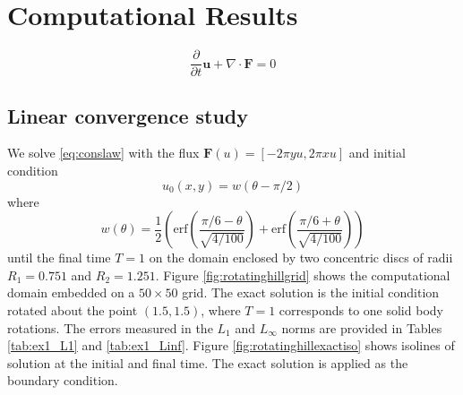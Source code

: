 \section{Computational Results}\label{compResults}
\begin{equation} \label{eq:conslaw}
   \frac{\partial}{\partial t} \mathbf{u} + \nabla \cdot \mathbf{F} = 0
\end{equation}
\subsection{Linear convergence study}
We solve \eqref{eq:conslaw} with the flux $\mathbf{F}(u) = [-2\pi y u, 2\pi x u]$ and initial condition
$$
u_0(x,y) = w(\theta - \pi/2)
$$
where
$$
w(\theta) = \frac{1}{2}\left( \text{erf}\left( \frac{\pi/6 - \theta}{\sqrt{4/100}} \right) + \text{erf}\left( \frac{\pi/6 + \theta}{\sqrt{4/100}} \right)\right)
$$
until the final time $T = 1$ on the domain enclosed by two concentric discs of radii $R_1 = 0.751$ and $R_2 = 1.251$.  Figure \ref{fig:rotatinghillgrid} shows the computational domain embedded on a $50 \times 50$ grid.  The exact solution is the initial condition rotated about the point $(1.5,1.5)$, where $T=1$ corresponds to one solid body rotations.  The errors measured in the $L_1$ and $L_\infty$ norms are provided in Tables \ref{tab:ex1_L1} and \ref{tab:ex1_Linf}.
Figure
\ref{fig:rotatinghillexactiso} shows isolines of solution at the initial and final time.  The exact solution is applied as the boundary condition.

